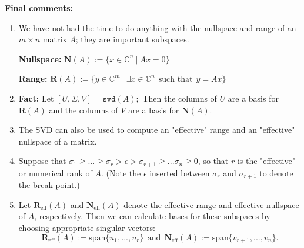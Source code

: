 \documentclass[letterpaper]{article}
\newcommand{\cp}{\mathbb C}    %
\newcommand{\spanof}[1]{\textrm{span} \{ #1 \}}
\begin{document}
\textbf{Final comments:}
\begin{enumerate}
\setlength{\itemsep}{.1in}
\renewcommand{\labelenumi}{(\alph{enumi})}
\item We have not had the time to do anything with the nullspace and range of an $m\times n$  matrix $A$; they are important subspaces.
    \vspace*{1cm}

\textbf{Nullspace:} $\mathbf{N}(A):=\{ x\in \cp^n~|~ Ax = 0\}$

 \vspace*{1cm}

\textbf{Range:} $\mathbf{R}(A):=\{ y\in \cp^m~|~ \exists x\in \cp^n~~\text{such that}~~ y = Ax \}$

 \vspace*{1cm}

 \item \textbf{Fact:} Let $[U,\Sigma,V]=\texttt{svd}(A);$ Then the columns of $U$ are a basis for $\mathbf{R}(A)$ and the columns of $V$ are a basis for $\mathbf{N}(A)$.

\item The SVD can also be used to compute an "effective" range and an "effective" nullspace of a matrix.

\item Suppose that $\sigma_1 \geq ... \geq \sigma_r > \epsilon > \sigma_{r+1} \geq ... \sigma_n \geq 0$, so that $r$ is the "effective" or numerical rank of $A$. (Note the $\epsilon$ inserted between $\sigma_r$ and $\sigma_{r+1}$ to denote the break point.)

\item Let $\mathbf{R}_{\text{eff}}(A)$ and $\mathbf{N}_\text{{eff}}(A)$ denote the effective range and effective nullspace of $A$, respectively. Then we can calculate bases for these subspaces by choosing appropriate singular vectors:
$$\mathbf{R}_{\text{eff}}(A) := \spanof{u_1, ..., u_r} ~~ \text{and} ~~ \mathbf{N}_{\text{eff}}(A) := \spanof{v_{r+1}, ..., v_n}.$$
\end{enumerate}
\end{document}
